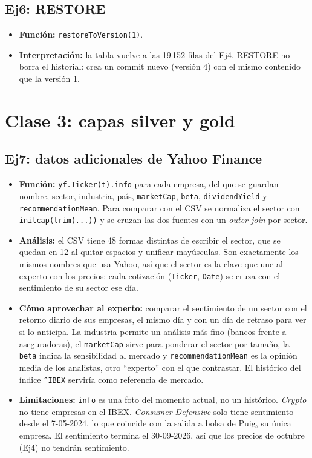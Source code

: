\documentclass[11pt,a4paper]{article}
\newcommand{\code}[1]{\texttt{#1}}
\begin{document}
\subsection*{Ej6: RESTORE}
\begin{itemize}
    \item \textbf{Función:} \code{restoreToVersion(1)}.
    \item \textbf{Interpretación:} la tabla vuelve a las 19\,152 filas del Ej4. RESTORE no borra el historial: crea un commit nuevo (versión 4) con el mismo contenido que la versión 1.
\end{itemize}

\section*{Clase 3: capas silver y gold}

\subsection*{Ej7: datos adicionales de Yahoo Finance}
\begin{itemize}
    \item \textbf{Función:} \code{yf.Ticker(t).info} para cada empresa, del que se guardan nombre, sector, industria, país, \code{marketCap}, \code{beta}, \code{dividendYield} y \code{recommendationMean}. Para comparar con el CSV se normaliza el sector con \code{initcap(trim(...))} y se cruzan las dos fuentes con un \textit{outer join} por sector.
    \item \textbf{Análisis:} el CSV tiene 48 formas distintas de escribir el sector, que se quedan en 12 al quitar espacios y unificar mayúsculas. Son exactamente los mismos nombres que usa Yahoo, así que el sector es la clave que une al experto con los precios: cada cotización (\code{Ticker}, \code{Date}) se cruza con el sentimiento de su sector ese día.
    \item \textbf{Cómo aprovechar al experto:} comparar el sentimiento de un sector con el retorno diario de sus empresas, el mismo día y con un día de retraso para ver si lo anticipa. La industria permite un análisis más fino (bancos frente a aseguradoras), el \code{marketCap} sirve para ponderar el sector por tamaño, la \code{beta} indica la sensibilidad al mercado y \code{recommendationMean} es la opinión media de los analistas, otro ``experto'' con el que contrastar. El histórico del índice \code{\textasciicircum IBEX} serviría como referencia de mercado.
    \item \textbf{Limitaciones:} \code{info} es una foto del momento actual, no un histórico. \textit{Crypto} no tiene empresas en el IBEX. \textit{Consumer Defensive} solo tiene sentimiento desde el 7-05-2024, lo que coincide con la salida a bolsa de Puig, su única empresa. El sentimiento termina el 30-09-2026, así que los precios de octubre (Ej4) no tendrán sentimiento.
\end{itemize}
\end{document}
